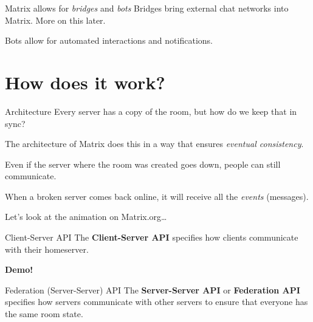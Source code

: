 \documentclass{acm}
\begin{document}
\begin{frame}{Matrix allows for \textit{bridges} and \textit{bots}}
    Bridges bring external chat networks into Matrix. More on this later.
    \pause

    Bots allow for automated interactions and notifications.
\end{frame}

\section{How does it work?}

\begin{frame}{Architecture}
    Every server has a copy of the room, but how do we keep that in sync?
    \pause

    The architecture of Matrix does this in a way that ensures \textit{eventual
    consistency}.
    \pause

    Even if the server where the room was created goes down, people can still
    communicate.

    When a broken server comes back online, it will receive all the
    \textit{events} (messages).
    \pause

    Let's look at the animation on Matrix.org\ldots
\end{frame}

\begin{frame}[fragile]{Client-Server API}
    The \textbf{Client-Server API} specifies how clients communicate with their
    homeserver.
    \pause
    \vspace{1in}

    \Huge
    \textbf{Demo!}
\end{frame}

\begin{frame}{Federation (Server-Server) API}
    The \textbf{Server-Server API} or \textbf{Federation API} specifies how
    servers communicate with other servers to ensure that everyone has the same
    room state.
\end{frame}
\end{document}
